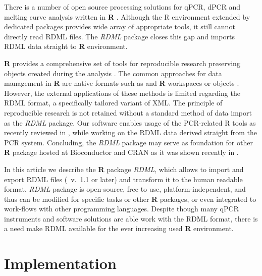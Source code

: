 \documentclass{bioinfo}
\begin{document}
	There is a number of open source processing solutions for qPCR, dPCR and melting curve 
	analysis written in \textbf{R} \cite{pabinger_2014, ritz_qpcr_2008, roediger_RJ_2013, 
	roediger2015chippcr}. Although the R environment extended by 
	dedicated packages provides wide array of appropriate tools, it still cannot 
	directly read RDML files. The \textit{RDML} package closes this gap and imports 
	RDML data straight to \textbf{R} environment.
	
	\textbf{R} provides a comprehensive set of tools for reproducible 
	research preserving objects created during the analysis 
	\cite{roediger2015r,roediger2015chippcr}. The common approaches for data 
	management in \textbf{R} are native formats such as and \textbf{R} 
	workspaces or objects \cite{roediger_rkward_2012}. However, the external 
	applications of these methods is limited regarding the RDML format, a 
	specifically tailored variant of XML. The principle of reproducible research is 
	not retained without a standard method of data import as the \textit{RDML} 
	package. Our software enables usage of the PCR-related R tools as recently 
	reviewed in \cite{pabinger_2014}, while working on the RDML data derived 
	straight from the PCR system. Concluding, the \textit{RDML} package may serve as 
	foundation for other \textbf{R} package hosted at Bioconductor 
	\cite{gentleman_2004} and CRAN as it was shown recently in \cite{roediger2015r}.
	
	In this article we describe the \textbf{R} package \textit{RDML}, which allows to
	import and export RDML files (~v.~1.1 or later) and transform it to the
	human readable format. \textit{RDML} package is open-source, free to use,
	platform-independent, and thus can be modified for specific tasks or other
	\textbf{R} packages, or even integrated to work-flows with other programming
	languages. Despite though many qPCR instruments and software solutions are able
	work with the RDML format, there is a need make RDML available for the ever
	increasing used \textbf{R} environment.
	
	\section{Implementation}
	
\end{document}
